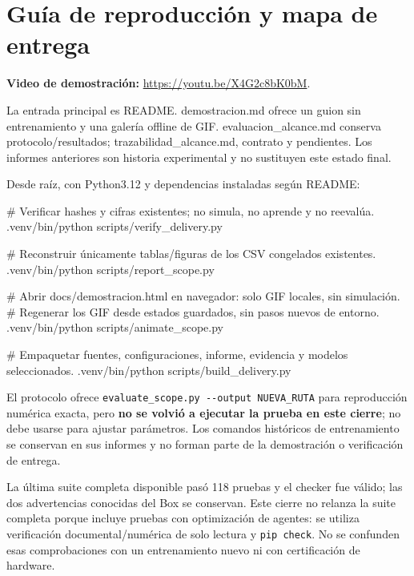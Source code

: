 \documentclass[12pt,a4paper]{article}
\begin{document}
\section{Guía de reproducción y mapa de entrega}
\textbf{Video de demostración:} \url{https://youtu.be/X4G2c8bK0bM}.


La entrada principal es \textcolor{Accent}{README}. \textcolor{Accent}{demostracion.md} ofrece un guion sin entrenamiento y una galería offline de GIF. \textcolor{Accent}{evaluacion\_alcance.md} conserva protocolo/\allowbreak{}resultados; \textcolor{Accent}{trazabilidad\_alcance.md},\allowbreak{} contrato y pendientes. Los informes anteriores son historia experimental y no sustituyen este estado final.


Desde raíz,\allowbreak{} con Python3.12 y dependencias instaladas según README:



\begin{CodeBlock}
# Verificar hashes y cifras existentes; no simula, no aprende y no reevalúa.
.venv/bin/python scripts/verify_delivery.py

# Reconstruir únicamente tablas/figuras de los CSV congelados existentes.
.venv/bin/python scripts/report_scope.py

# Abrir docs/demostracion.html en navegador: solo GIF locales, sin simulación.
# Regenerar los GIF desde estados guardados, sin pasos nuevos de entorno.
.venv/bin/python scripts/animate_scope.py

# Empaquetar fuentes, configuraciones, informe, evidencia y modelos seleccionados.
.venv/bin/python scripts/build_delivery.py
\end{CodeBlock}

El protocolo ofrece \nolinkurl{evaluate_scope.py --output NUEVA_RUTA} para reproducción numérica exacta,\allowbreak{} pero \textbf{no se volvió a ejecutar la prueba en este cierre}; no debe usarse para ajustar parámetros. Los comandos históricos de entrenamiento se conservan en sus informes y no forman parte de la demostración o verificación de entrega.


La última suite completa disponible pasó 118 pruebas y el checker fue válido; las dos advertencias conocidas del Box se conservan. Este cierre no relanza la suite completa porque incluye pruebas con optimización de agentes: se utiliza verificación documental/\allowbreak{}numérica de solo lectura y \nolinkurl{pip check}. No se confunden esas comprobaciones con un entrenamiento nuevo ni con certificación de hardware.
\end{document}
